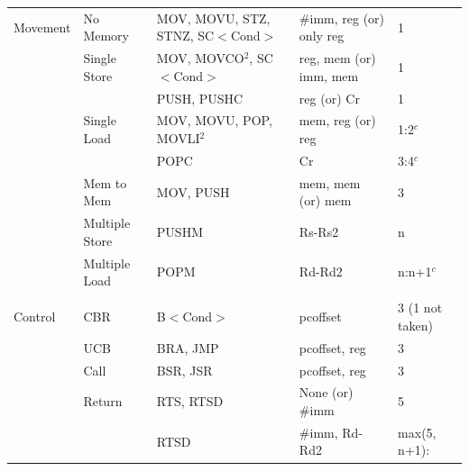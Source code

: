 \begin{table}
\begin{subtable}{\linewidth}
\begin{center}
\begin{tabular}{lllll}
Movement           & No Memory          & MOV, MOVU, STZ, STNZ, SC$<$Cond$>$     & \#imm, reg (or) only reg           & 1                        \\
                   & Single Store       & MOV, MOVCO$^2$, SC$<$Cond$>$           & reg, mem (or) imm, mem             & 1                        \\
                   &                    & PUSH, PUSHC                            & reg (or) Cr                        & 1                        \\
                   & Single Load        & MOV, MOVU, POP, MOVLI$^2$              & mem, reg (or) reg                  & 1:2$^c$                  \\
                   &                    & POPC                                   & Cr                                 & 3:4$^c$                  \\
                   & Mem to Mem         & MOV, PUSH                              & mem, mem (or) mem                  & 3                        \\
                   & Multiple Store     & PUSHM                                  & Rs-Rs2                             & n                        \\
                   & Multiple Load      & POPM                                   & Rd-Rd2                             & n:n+1$^c$                \\
                   &                    &                                        &                                    &                          \\
Control            & CBR                & B$<$Cond$>$                            & pcoffset                           & 3 (1 not taken)          \\
                   & UCB                & BRA, JMP                               & pcoffset, reg                      & 3                        \\
                   & Call               & BSR, JSR                               & pcoffset, reg                      & 3                        \\
                   & Return             & RTS, RTSD                              & None (or) \#imm                    & 5                        \\
                   &                    & RTSD                                   & \#imm, Rd-Rd2                      & max(5, n+1):             \\

\end{tabular}
\end{center}
\end{subtable}
\end{table}

